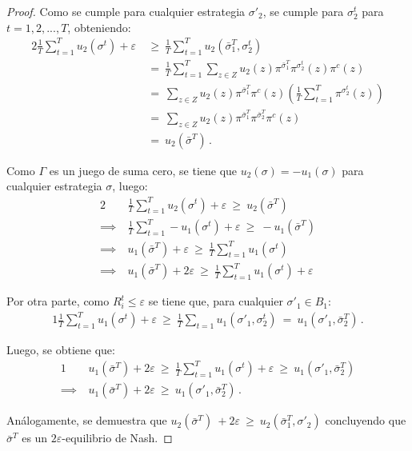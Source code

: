 \begin{proof}
Como se cumple para cualquier estrategia $\sigma'_2$, se cumple para $\sigma_2^t$ para $t = 1, 2, ..., T$, obteniendo:
\begin{alignat}{2}
\frac{1}{T} \sum_{t = 1}^T u_2(\sigma^t) + \varepsilon\ & \geq\ \frac{1}{T} \sum_{t = 1}^T u_2(\bar{\sigma}_1^T, \sigma_2^t) \\
&=\ \frac{1}{T} \sum_{t = 1}^T \sum_{z \in Z} u_2(z) \pi^{\bar{\sigma}_1^T}\pi^{\sigma_2^t}(z) \pi^c(z) \\
&=\  \sum_{z \in Z} u_2(z) \pi^{\bar{\sigma}_1^T} \pi^c(z) \left( \frac{1}{T} \sum_{t = 1}^T \pi^{\sigma_2^t}(z) \right)\\
&=\  \sum_{z \in Z} u_2(z) \pi^{\bar{\sigma}_1^T} \pi^{\bar{\sigma}_2^T} \pi^c(z) \\
&=\ u_2(\bar{\sigma}^T) \,.
\end{alignat}

Como $\Gamma$ es un juego de suma cero, se tiene que $u_2(\sigma) = -u_1(\sigma)$ para cualquier estrategia $\sigma$, luego:
\begin{alignat}{2}
	& \frac{1}{T} \sum_{t = 1}^T u_2(\sigma^t) + \varepsilon\ \geq\  u_2(\bar{\sigma}^T) \\
	\implies\ & \frac{1}{T} \sum_{t = 1}^T -u_1(\sigma^t) + \varepsilon\ \geq\  -u_1(\bar{\sigma}^T) \\
	\implies\ &  u_1(\bar{\sigma}^T) + \varepsilon\ \geq\   \frac{1}{T} \sum_{t = 1}^T u_1(\sigma^t)  \\
	\implies\ &  u_1(\bar{\sigma}^T) + 2\varepsilon\ \geq\   \frac{1}{T} \sum_{t = 1}^T u_1(\sigma^t) + \varepsilon
\end{alignat}

Por otra parte, como $R_i^t \leq \varepsilon$ se tiene que, para cualquier $\sigma'_1 \in B_1$:
\begin{alignat}{1}
	\frac{1}{T} \sum_{t = 1}^T u_1(\sigma^t) + \varepsilon\ \geq\ \frac{1}{T} \sum_{t = 1} u_1(\sigma'_1, \sigma_2^t)\ =\ u_1(\sigma'_1, \bar{\sigma}_2^T) \,.
\end{alignat}

Luego, se obtiene que:
\begin{alignat}{1}
	& u_1(\bar{\sigma}^T) + 2\varepsilon\ \geq\   \frac{1}{T} \sum_{t = 1}^T u_1(\sigma^t) + \varepsilon\ \geq\ u_1(\sigma'_1, \bar{\sigma}_2^T)\\
	\implies\ & u_1(\bar{\sigma}^T) + 2\varepsilon\ \geq\ u_1(\sigma'_1, \bar{\sigma}_2^T) \,.
\end{alignat}

Análogamente, se demuestra que $u_2(\bar{\sigma}^T)\ + 2\varepsilon\ \geq\ u_2( \bar{\sigma}_1^T, \sigma'_2)$ concluyendo que $\bar{\sigma}^T$ es un $2\varepsilon$-equilibrio de Nash.
\end{proof}

